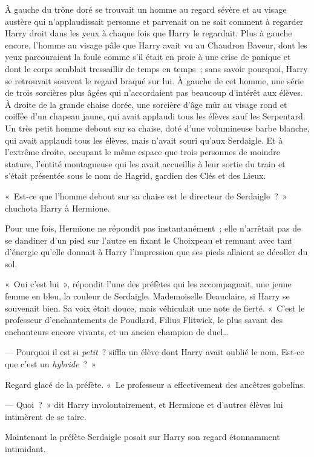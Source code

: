 À gauche du trône doré se trouvait un homme au regard sévère et au visage austère qui n'applaudissait personne et parvenait on ne sait comment à regarder Harry droit dans les yeux à chaque fois que Harry le regardait.
Plus à gauche encore, l'homme au visage pâle que Harry avait vu au Chaudron Baveur, dont les yeux parcouraient la foule comme s'il était en proie à une crise de panique et dont le corps semblait tressaillir de temps en temps~; sans savoir pourquoi, Harry se retrouvait souvent le regard braqué sur lui.
À gauche de cet homme, une série de trois sorcières plus âgées qui n'accordaient pas beaucoup d'intérêt aux élèves.
À droite de la grande chaise dorée, une sorcière d'âge mûr au visage rond et coiffée d'un chapeau jaune, qui avait applaudi tous les élèves sauf les Serpentard.
Un très petit homme debout sur sa chaise, doté d'une volumineuse barbe blanche, qui avait applaudi tous les élèves, mais n'avait souri qu'aux Serdaigle.
Et à l'extrême droite, occupant le même espace que trois personnes de moindre stature, l'entité montagneuse qui les avait accueillis à leur sortie du train et s'était présentée sous le nom de Hagrid, gardien des Clés et des Lieux.

«~Est-ce que l'homme debout sur sa chaise est le directeur de Serdaigle~?~» chuchota Harry à Hermione.

Pour une fois, Hermione ne répondit pas instantanément~; elle n'arrêtait pas de se dandiner d'un pied sur l'autre en fixant le Choixpeau et remuant avec tant d'énergie qu'elle donnait à Harry l'impression que ses pieds allaient se décoller du sol.

«~Oui c'est lui~», répondit l'une des préfètes qui les accompagnait, une jeune femme en bleu, la couleur de Serdaigle.
Mademoiselle Deauclaire, si Harry se souvenait bien.
Sa voix était douce, mais véhiculait une note de fierté.
«~C'est le professeur d'enchantements de Poudlard, Filius Flitwick, le plus savant des enchanteurs encore vivants, et un ancien champion de duel…

--- Pourquoi il est si \emph{petit}~? siffla un élève dont Harry avait oublié le nom. Est-ce que c'est un \emph{hybride}~?~»

Regard glacé de la préfète. «~Le professeur a effectivement des ancêtres gobelins.

--- Quoi~?~» dit Harry involontairement, et Hermione et d'autres élèves lui intimèrent de se taire.

Maintenant la préfète Serdaigle posait sur Harry son regard étonnamment intimidant.

